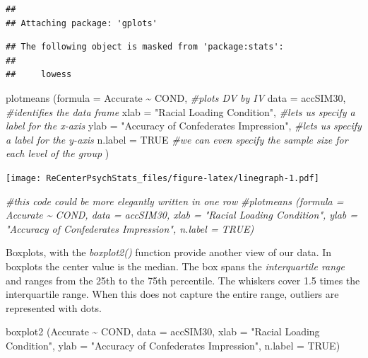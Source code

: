 \documentclass[
  english,
]{book}
\newenvironment{Shaded}{\begin{snugshade}}{\end{snugshade}}
\newcommand{\AttributeTok}[1]{\textcolor[rgb]{0.77,0.63,0.00}{#1}}
\newcommand{\CommentTok}[1]{\textcolor[rgb]{0.56,0.35,0.01}{\textit{#1}}}
\newcommand{\ConstantTok}[1]{\textcolor[rgb]{0.00,0.00,0.00}{#1}}
\newcommand{\FunctionTok}[1]{\textcolor[rgb]{0.00,0.00,0.00}{#1}}
\newcommand{\NormalTok}[1]{#1}
\newcommand{\SpecialCharTok}[1]{\textcolor[rgb]{0.00,0.00,0.00}{#1}}
\newcommand{\StringTok}[1]{\textcolor[rgb]{0.31,0.60,0.02}{#1}}
\begin{document}
\begin{verbatim}
## 
## Attaching package: 'gplots'
\end{verbatim}

\begin{verbatim}
## The following object is masked from 'package:stats':
## 
##     lowess
\end{verbatim}

\begin{Shaded}
\begin{Highlighting}[]
\FunctionTok{plotmeans}\NormalTok{ (}\AttributeTok{formula =}\NormalTok{ Accurate }\SpecialCharTok{\textasciitilde{}}\NormalTok{ COND, }\CommentTok{\#plots DV by IV}
           \AttributeTok{data =}\NormalTok{ accSIM30, }\CommentTok{\#identifies the data frame}
           \AttributeTok{xlab =} \StringTok{"Racial Loading Condition"}\NormalTok{, }\CommentTok{\#let\textquotesingle{}s us specify a label for the x{-}axis}
           \AttributeTok{ylab =} \StringTok{"Accuracy of Confederate\textquotesingle{}s Impression"}\NormalTok{, }\CommentTok{\#let\textquotesingle{}s us specify a label for the y{-}axis}
           \AttributeTok{n.label =} \ConstantTok{TRUE}  \CommentTok{\#we can even specify the sample size for each level of the group}
\NormalTok{           )}
\end{Highlighting}
\end{Shaded}

\texttt{[image: ReCenterPsychStats\_files/figure-latex/linegraph-1.pdf]}

\begin{Shaded}
\begin{Highlighting}[]
\CommentTok{\#this code could be more elegantly written in one row}
\CommentTok{\#plotmeans (formula = Accurate \textasciitilde{} COND, data = accSIM30, xlab = "Racial Loading Condition", ylab = "Accuracy of Confederate\textquotesingle{}s Impression", n.label = TRUE)}
\end{Highlighting}
\end{Shaded}

Boxplots, with the \emph{boxplot2()} function provide another view of our data. In boxplots the center value is the median. The box spans the \emph{interquartile range} and ranges from the 25th to the 75th percentile. The whiskers cover 1.5 times the interquartile range. When this does not capture the entire range, outliers are represented with dots.

\begin{Shaded}
\begin{Highlighting}[]
\FunctionTok{boxplot2}\NormalTok{ (Accurate }\SpecialCharTok{\textasciitilde{}}\NormalTok{ COND, }\AttributeTok{data =}\NormalTok{ accSIM30, }\AttributeTok{xlab =} \StringTok{"Racial Loading Condition"}\NormalTok{, }\AttributeTok{ylab =} \StringTok{"Accuracy of Confederate\textquotesingle{}s Impression"}\NormalTok{, }\AttributeTok{n.label =} \ConstantTok{TRUE}\NormalTok{)}
\end{Highlighting}
\end{Shaded}
\end{document}
